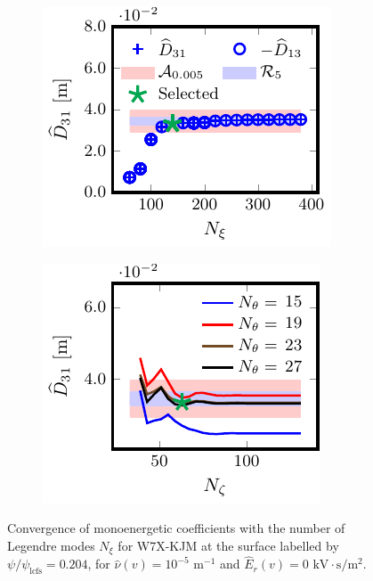 \documentclass[10pt]{iopart}
\begin{document}
\begin{figure}[t]
	
	\begin{subfigure}[t]{0.32\textwidth}
		\includegraphics{Convergence-Legendre-W7X-KJM-s0204-Er-0-D31-Detail}
		\caption{}
		\label{subfig:D31_convergence_Legendre_W7X_KJM_0204_Erho_0_Detail}
	\end{subfigure}
	\begin{subfigure}[t]{0.32\textwidth}
		\includegraphics{Convergence-theta-zeta-W7X-KJM-s0204-Er-0-D31}
		\caption{}
		\label{subfig:D31_convergence_theta_zeta_W7X_KJM_0204_Erho_0}
	\end{subfigure}
	\caption{Convergence of monoenergetic coefficients with the number of Legendre modes $N_\xi$ for W7X-KJM at the surface labelled by $\psi/\psi_{\text{lcfs}}=0.204$, for $\hat{\nu}(v)=10^{-5}$ $\text{m}^{-1}$ and $\hat{E}_r(v)=0$ $\text{kV}\cdot\text{s}/\text{m}^2$.}
	\label{fig:Convergence_W7X_KJM_Er_0}
\end{figure}
\end{document}
